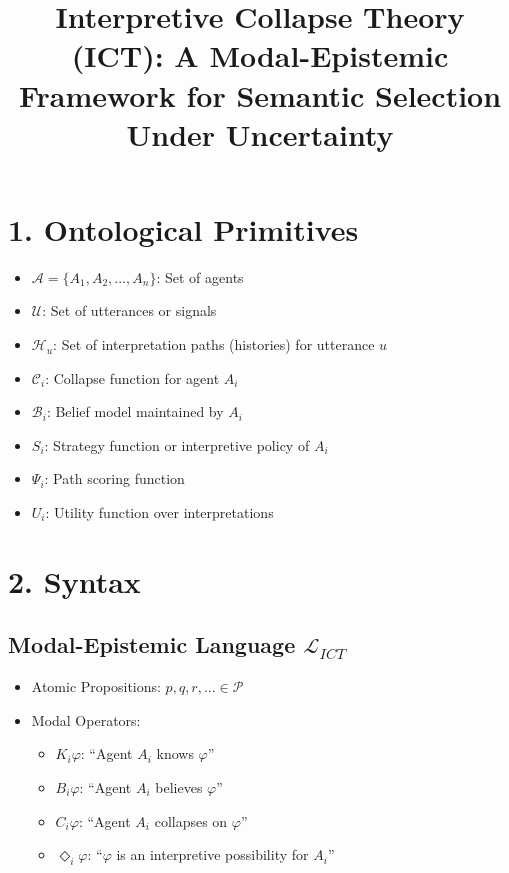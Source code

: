 \documentclass{article}
\title{Interpretive Collapse Theory (ICT): A Modal-Epistemic Framework for Semantic Selection Under Uncertainty}
\author{}
\date{}
\begin{document}
\maketitle

\section*{1. Ontological Primitives}
\begin{itemize}
  \item \( \mathcal{A} = \{A_1, A_2, ..., A_n\} \): Set of agents
  \item \( \mathcal{U} \): Set of utterances or signals
  \item \( \mathcal{H}_u \): Set of interpretation paths (histories) for utterance \( u \)
  \item \( \mathcal{C}_i \): Collapse function for agent \( A_i \)
  \item \( \mathcal{B}_i \): Belief model maintained by \( A_i \)
  \item \( S_i \): Strategy function or interpretive policy of \( A_i \)
  \item \( \Psi_i \): Path scoring function
  \item \( U_i \): Utility function over interpretations
\end{itemize}

\section*{2. Syntax}
\subsection*{Modal-Epistemic Language \( \mathcal{L}_{ICT} \)}
\begin{itemize}
  \item Atomic Propositions: \( p, q, r, \dots \in \mathcal{P} \)
  \item Modal Operators:
  \begin{itemize}
    \item \( K_i \varphi \): ``Agent \( A_i \) knows \( \varphi \)''
    \item \( B_i \varphi \): ``Agent \( A_i \) believes \( \varphi \)''
    \item \( C_i \varphi \): ``Agent \( A_i \) collapses on \( \varphi \)''
    \item \( \Diamond_i \varphi \): ``\( \varphi \) is an interpretive possibility for \( A_i \)''
  \end{itemize}
\end{itemize}
\end{document}
